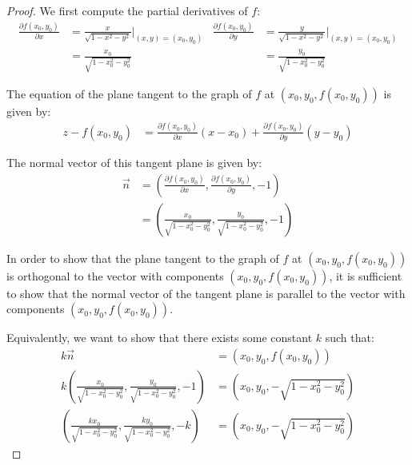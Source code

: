 \begin{proof}
    We first compute the partial derivatives of \(f\):
    \begin{align*}
        \frac{\partial f(x_0, y_0)}{\partial x} &= \frac{x}{\sqrt{1 - x^2 - y^2}}\Biggr|_{(x, y) = (x_0, y_0)} & \frac{\partial f(x_0, y_0)}{\partial y} &= \frac{y}{\sqrt{1 - x^2 - y^2}}\Biggr|_{(x, y) = (x_0, y_0)} \\
        &= \frac{x_0}{\sqrt{1 - x_0^2 - y_0^2}} & &= \frac{y_0}{\sqrt{1 - x_0^2 - y_0^2}}
    \end{align*}
    
    The equation of the plane tangent to the graph of \(f\) at \((x_0, y_0, f(x_0, y_0))\) is given by:
    \begin{align}
        z - f(x_0, y_0) &= \frac{\partial f(x_0, y_0)}{\partial x}(x - x_0) + \frac{\partial f(x_0, y_0)}{\partial y}(y - y_0)
    \end{align}
    
    The normal vector of this tangent plane is given by:
    \begin{align}
        \vec{n} &= \left(\frac{\partial f(x_0, y_0)}{\partial x}, \frac{\partial f(x_0, y_0)}{\partial y}, -1\right) \\
        &= \left(\frac{x_0}{\sqrt{1 - x_0^2 - y_0^2}}, \frac{y_0}{\sqrt{1 - x_0^2 - y_0^2}}, -1\right) 
    \end{align}
    
    In order to show that the plane tangent to the graph of \(f\) at \((x_0, y_0, f(x_0, y_0))\) is orthogonal to the vector with components \((x_0, y_0, f(x_0, y_0))\), it is sufficient to show that the normal vector of the tangent plane is parallel to the vector with components \((x_0, y_0, f(x_0, y_0))\).
    
    Equivalently, we want to show that there exists some constant \(k\) such that:
    \begin{align}
        k \vec{n} &= (x_0, y_0, f(x_0, y_0)) \\
        k \left(\frac{x_0}{\sqrt{1 - x_0^2 - y_0^2}}, \frac{y_0}{\sqrt{1 - x_0^2 - y_0^2}}, -1\right) &= \left(x_0, y_0, -\sqrt{1 - x_0^2 - y_0^2}\right) \\
        \left(\frac{kx_0}{\sqrt{1 - x_0^2 - y_0^2}}, \frac{ky_0}{\sqrt{1 - x_0^2 - y_0^2}}, -k\right) &= \left(x_0, y_0, -\sqrt{1 - x_0^2 - y_0^2}\right)
    \end{align}
    

\end{proof}

